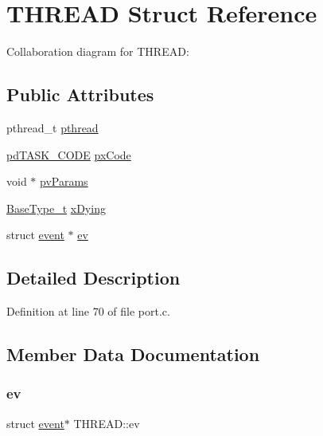\hypertarget{struct_t_h_r_e_a_d}{}\section{T\+H\+R\+E\+AD Struct Reference}
\label{struct_t_h_r_e_a_d}


Collaboration diagram for T\+H\+R\+E\+AD\+:
\subsection*{Public Attributes}
\begin{DoxyCompactItemize}
\item 
pthread\+\_\+t \hyperlink{struct_t_h_r_e_a_d_a50e8589a10aced2217d78908c8f3c872}{pthread}
\item 
\hyperlink{vendor_2ceedling_2plugins_2freertos_2vendor_2freertos_2include_2_free_r_t_o_s_8h_a74cee96c96792dab96bdc57ba9007b24}{pd\+T\+A\+S\+K\+\_\+\+C\+O\+DE} \hyperlink{struct_t_h_r_e_a_d_aef06542fdf89760a1fd3485aea297935}{px\+Code}
\item 
void $\ast$ \hyperlink{struct_t_h_r_e_a_d_add6711bad712097bc2f5902fe4b15fa0}{pv\+Params}
\item 
\hyperlink{externals_2freertos_2portable_2_g_c_c_2_a_r_m___c_m0_2portmacro_8h_a46fb21e00ae0729d7515c0fbf2269796}{Base\+Type\+\_\+t} \hyperlink{struct_t_h_r_e_a_d_ade881e6e1d6e6671ae9563520e865426}{x\+Dying}
\item 
struct \hyperlink{structevent}{event} $\ast$ \hyperlink{struct_t_h_r_e_a_d_a4c38394eeadf5a8779bcf7d87dd4465c}{ev}
\end{DoxyCompactItemize}


\subsection{Detailed Description}


Definition at line 70 of file port.\+c.



\subsection{Member Data Documentation}
\mbox{\label{struct_t_h_r_e_a_d_a4c38394eeadf5a8779bcf7d87dd4465c}} 
\subsubsection{\texorpdfstring{ev}{ev}}
{\footnotesize\ttfamily struct \hyperlink{structevent}{event}$\ast$ T\+H\+R\+E\+A\+D\+::ev}



